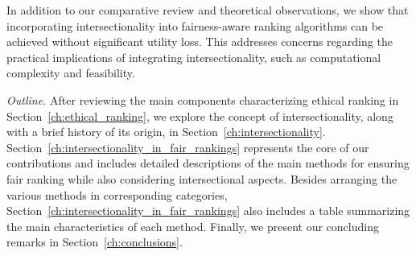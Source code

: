 In addition to our comparative review and theoretical observations, we show that incorporating intersectionality into fairness-aware ranking algorithms can be achieved without significant utility loss. This addresses concerns regarding the practical implications of integrating intersectionality, such as computational complexity and feasibility.

\emph{Outline.} After reviewing the main components characterizing ethical ranking in Section~\ref{ch:ethical_ranking}, we explore the concept of intersectionality, along with a brief history of its origin, in Section~\ref{ch:intersectionality}.
Section~\ref{ch:intersectionality_in_fair_rankings} represents the core of our contributions and includes detailed descriptions of the main methods for ensuring fair ranking while also considering intersectional aspects. Besides arranging the various methods in corresponding categories, Section~\ref{ch:intersectionality_in_fair_rankings} also includes a table summarizing the main characteristics of each method.
Finally, we present our concluding remarks in Section~\ref{ch:conclusions}.

